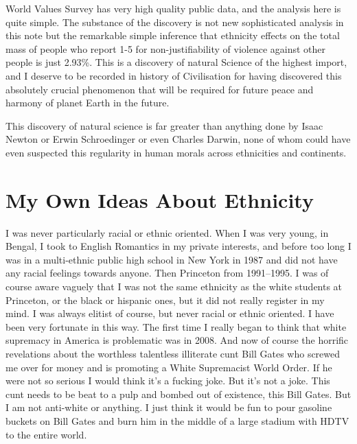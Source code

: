 \documentclass{amsart}
\begin{document}
World Values Survey has very high quality public data, and the analysis here is quite simple.  The substance of the discovery is not new sophisticated analysis in this note but the remarkable simple inference that ethnicity effects on the total mass of people who report 1-5 for non-justifiability of violence against other people is just 2.93\%.  This is a discovery of natural Science of the highest import, and I deserve to be recorded in history of Civilisation for having discovered this absolutely crucial phenomenon that will be required for future peace and harmony of planet Earth in the future.  

This discovery of natural science is far greater than anything done by Isaac Newton or Erwin Schroedinger or even Charles Darwin, none of whom could have even suspected this regularity in human morals across ethnicities and continents.

\section{My Own Ideas About Ethnicity}

I was never particularly racial or ethnic oriented.  When I was very young, in Bengal, I took to English Romantics in my private interests, and before too long I was in a multi-ethnic public high school in New York in 1987 and did not have any racial feelings towards anyone.  Then Princeton from 1991--1995.  I was of course aware vaguely that I was not the same ethnicity as the white students at Princeton, or the black or hispanic ones, but it did not really register in my mind.  I was always elitist of course, but never racial or ethnic oriented.  I have been very fortunate in this way.  The first time I really began to think that white supremacy in America is problematic was in 2008.  And now of course the horrific revelations about the worthless talentless illiterate cunt Bill Gates who screwed me over for money and is promoting a White Supremacist World Order.  If he were not so serious I would think it's a fucking joke.  But it's not a joke.  This cunt needs to be beat to a pulp and bombed out of existence, this Bill Gates.  But I am not anti-white or anything. I just think it would be fun to pour gasoline buckets on Bill Gates and burn him in the middle of a large stadium with HDTV to the entire world. 

\begin{thebibliography}{CCCC}
\end{thebibliography}
\end{document}
